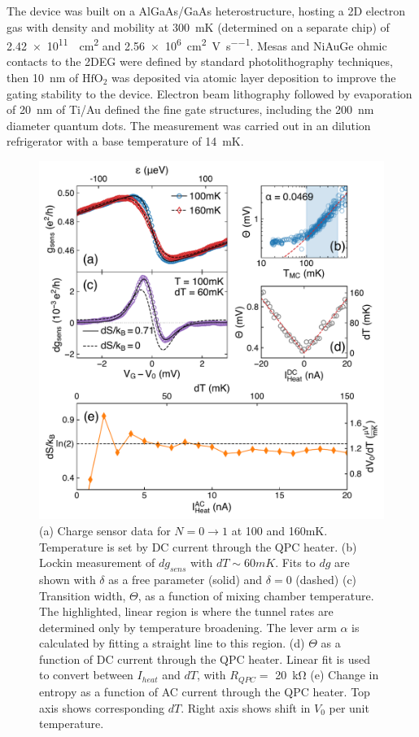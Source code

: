 \documentclass[preprint,showpacs,preprintnumbers,amsmath,amssymb,pra,aps,superscriptaddress]{revtex4-1}
\begin{document}
The device was built on a AlGaAs/GaAs heterostructure, hosting a 2D electron gas with density and mobility at \SI{300}{\milli\kelvin} (determined on a separate chip) of \SI{2.42e11}{\per\square\centi\metre} and \SI[per-mode=symbol]{2.56e6}{\square\centi\metre\per\volt\per\second}.   Mesas and NiAuGe ohmic contacts to the 2DEG were defined by standard photolithography techniques, then \SI{10}{\nano\metre} of $\mathrm{HfO_2}$ was deposited via atomic layer deposition to improve the gating stability to the device. Electron beam lithography followed by evaporation of \SI{20}{\nano\metre} of Ti/Au defined the fine gate structures, including the \SI{200}{\nano\metre} diameter quantum dots. The measurement was carried out in an dilution refrigerator with a base temperature of \SI{14}{\milli\kelvin}.


\begin{figure}[!]
        \includegraphics[width=1.0\columnwidth]{../figures/figure_2.pdf}
        \caption{\label{fig:fig2}(a) Charge sensor data for $N=0 \rightarrow 1$ at 100 and 160mK. Temperature is set by DC current through the QPC heater. (b) Lockin measurement of $dg_{sens}$ with $dT \sim 60mK$. Fits to $dg$ are shown with $\delta$ as a free parameter (solid) and $\delta=0$ (dashed) (c) Transition width, $\Theta$, as a function of mixing chamber temperature. The highlighted, linear region is where the tunnel rates are determined only by temperature broadening. The lever arm $\alpha$ is calculated by fitting a straight line to this region. (d) $\Theta$ as a function of DC current through the QPC heater. Linear fit is used to convert between $I_{heat}$ and $dT$, with $R_{QPC} = $ \SI{20}{\kilo\ohm} (e) Change in entropy as a function of AC current through the QPC heater. Top axis shows corresponding $dT$. Right axis shows shift in $V_0$ per unit temperature.}
\end{figure}
\end{document}
